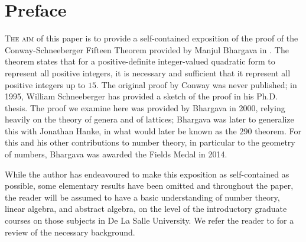 \chapter*{Preface}

{\scshape The aim} of this paper is to provide a self-contained exposition of
the proof of the Conway-Schneeberger Fifteen Theorem provided by Manjul Bhargava
in \cite{bhargava2000conway}. The theorem states that for a positive-definite
integer-valued quadratic form to represent all positive integers, it is
necessary and sufficient that it represent all positive integers up to \(15\).
The original proof by Conway was never published; in 1995, William Schneeberger
has provided a sketch of the proof in his Ph.D. thesis.
\cite{schneeberger1997arithmetic} The proof we examine here was provided by
Bhargava in 2000, relying heavily on the theory of genera and of lattices;
Bhargava was later to generalize this with Jonathan Hanke, in what would later
be known as the \(290\) theorem. \cite{bhargava2005universal} For this and his
other contributions to number theory, in particular to the geometry of numbers,
Bhargava was awarded the Fields Medal in 2014. \cite{bhargava2014fields}

While the author has endeavoured to make this exposition as self-contained as
possible, some elementary results have been omitted and throughout the paper,
the reader will be assumed to have a basic understanding of number theory,
linear algebra, and abstract algebra, on the level of the introductory graduate
courses on those subjects in De La Salle University. We refer the reader to
\cite{dudley1978elementary,halmos1942vector,hungerford2012algebra} for a review
of the necessary background.


